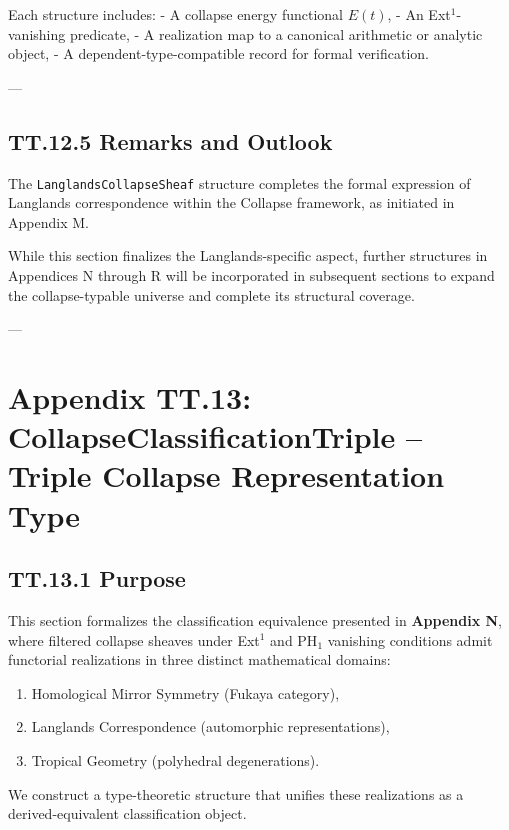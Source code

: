 \documentclass[11pt]{article}
\begin{document}
{Each structure includes:
- A collapse energy functional \( E(t) \),
- An Ext$^1$-vanishing predicate,
- A realization map to a canonical arithmetic or analytic object,
- A dependent-type-compatible record for formal verification.

---

\subsection*{TT.12.5 Remarks and Outlook}

The \texttt{LanglandsCollapseSheaf} structure completes the formal expression  
of Langlands correspondence within the Collapse framework, as initiated in Appendix M.

While this section finalizes the Langlands-specific aspect,  
further structures in Appendices N through R will be incorporated in subsequent sections  
to expand the collapse-typable universe and complete its structural coverage.

---

\section*{Appendix TT.13: CollapseClassificationTriple – Triple Collapse Representation Type}

\subsection*{TT.13.1 Purpose}

This section formalizes the classification equivalence presented in \textbf{Appendix N},  
where filtered collapse sheaves under Ext$^1$ and PH$_1$ vanishing conditions admit  
functorial realizations in three distinct mathematical domains:

\begin{enumerate}
  \item Homological Mirror Symmetry (Fukaya category),
  \item Langlands Correspondence (automorphic representations),
  \item Tropical Geometry (polyhedral degenerations).
\end{enumerate}

We construct a type-theoretic structure that unifies these realizations  
as a derived-equivalent classification object.

}
\end{document}
